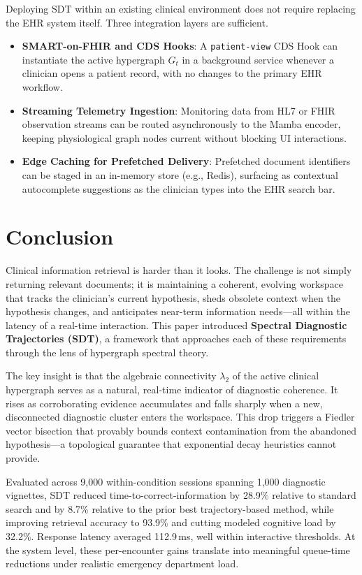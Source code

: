\documentclass[10pt, onecolumn]{article}
\begin{document}
Deploying SDT within an existing clinical environment does not require replacing the EHR system itself. Three integration layers are sufficient.
\begin{itemize}
  \item \textbf{SMART-on-FHIR and CDS Hooks}: A \texttt{patient-view} CDS Hook can instantiate the active hypergraph $G_t$ in a background service whenever a clinician opens a patient record, with no changes to the primary EHR workflow.
  \item \textbf{Streaming Telemetry Ingestion}: Monitoring data from HL7 or FHIR observation streams can be routed asynchronously to the Mamba encoder, keeping physiological graph nodes current without blocking UI interactions.
  \item \textbf{Edge Caching for Prefetched Delivery}: Prefetched document identifiers can be staged in an in-memory store (e.g., Redis), surfacing as contextual autocomplete suggestions as the clinician types into the EHR search bar.
\end{itemize}

\section{Conclusion}
\label{sec:conclusion}

Clinical information retrieval is harder than it looks. The challenge is not simply returning relevant documents; it is maintaining a coherent, evolving workspace that tracks the clinician's current hypothesis, sheds obsolete context when the hypothesis changes, and anticipates near-term information needs---all within the latency of a real-time interaction. This paper introduced \textbf{Spectral Diagnostic Trajectories (SDT)}, a framework that approaches each of these requirements through the lens of hypergraph spectral theory.

The key insight is that the algebraic connectivity $\lambda_2$ of the active clinical hypergraph serves as a natural, real-time indicator of diagnostic coherence. It rises as corroborating evidence accumulates and falls sharply when a new, disconnected diagnostic cluster enters the workspace. This drop triggers a Fiedler vector bisection that provably bounds context contamination from the abandoned hypothesis---a topological guarantee that exponential decay heuristics cannot provide.

Evaluated across 9,000 within-condition sessions spanning 1,000 diagnostic vignettes, SDT reduced time-to-correct-information by 28.9\% relative to standard search and by 8.7\% relative to the prior best trajectory-based method, while improving retrieval accuracy to 93.9\% and cutting modeled cognitive load by 32.2\%. Response latency averaged 112.9\,ms, well within interactive thresholds. At the system level, these per-encounter gains translate into meaningful queue-time reductions under realistic emergency department load.
\end{document}
